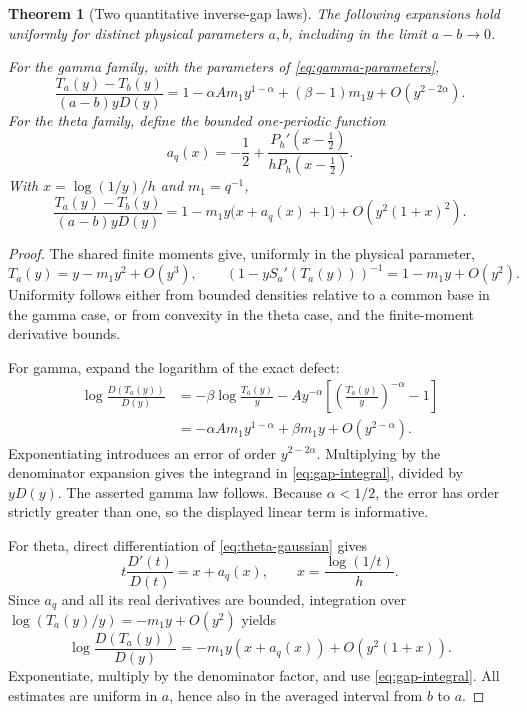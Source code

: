 \documentclass[11pt,a4paper]{article}
\numberwithin{equation}{section}
\newtheorem{theorem}{Theorem}[section]
\theoremstyle{definition}
\theoremstyle{remark}
\begin{document}
\begin{theorem}[Two quantitative inverse-gap laws]
\label{thm:gap-laws}
The following expansions hold uniformly for distinct physical
parameters \(a,b\), including in the limit \(a-b\to0\).

For the gamma family, with the parameters of \eqref{eq:gamma-parameters},
\begin{equation}
 \frac{T_a(y)-T_b(y)}{(a-b)yD(y)}
 =1-\alpha A m_1y^{1-\alpha}
       +(\beta-1)m_1y+O(y^{2-2\alpha}).
 \label{eq:gamma-gap}
\end{equation}
For the theta family, define the bounded one-periodic function
\begin{equation}
 a_q(x)=-\frac12+
 \frac{P_h'(x-\frac12)}{hP_h(x-\frac12)}.
 \label{eq:aq}
\end{equation}
With \(x=\log(1/y)/h\) and \(m_1=q^{-1}\),
\begin{equation}
 \frac{T_a(y)-T_b(y)}{(a-b)yD(y)}
 =1-m_1y\bigl(x+a_q(x)+1\bigr)
       +O\!\left(y^2(1+x)^2\right).
 \label{eq:q-gap}
\end{equation}
\end{theorem}
\begin{proof}
The shared finite moments give, uniformly in the physical parameter,
\[
 T_a(y)=y-m_1y^2+O(y^3),\qquad
 (1-yS_a'(T_a(y)))^{-1}=1-m_1y+O(y^2).
\]
Uniformity follows either from bounded densities relative to a common
base in the gamma case, or from convexity in the theta case, and the
finite-moment derivative bounds.

For gamma, expand the logarithm of the exact defect:
\begin{align*}
 \log\frac{D(T_a(y))}{D(y)}
 &=-\beta\log\frac{T_a(y)}y
   -Ay^{-\alpha}\left[\left(\frac{T_a(y)}y\right)^{-\alpha}-1\right]\\
 &=-\alpha A m_1y^{1-\alpha}+\beta m_1y+O(y^{2-\alpha}).
\end{align*}
Exponentiating introduces an error of order \(y^{2-2\alpha}\).
Multiplying by the denominator expansion gives the integrand in
\eqref{eq:gap-integral}, divided by \(yD(y)\). The asserted gamma law
follows. Because \(\alpha<1/2\), the error has order strictly greater
than one, so the displayed linear term is informative.

For theta, direct differentiation of \eqref{eq:theta-gaussian} gives
\begin{equation}
 t\frac{D'(t)}{D(t)}=x+a_q(x),
 \qquad x=\frac{\log(1/t)}h.
 \label{eq:theta-slope}
\end{equation}
Since \(a_q\) and all its real derivatives are bounded, integration over
\(\log(T_a(y)/y)=-m_1y+O(y^2)\) yields
\[
 \log\frac{D(T_a(y))}{D(y)}
 =-m_1y(x+a_q(x))+O(y^2(1+x)).
\]
Exponentiate, multiply by the denominator factor, and use
\eqref{eq:gap-integral}. All estimates are uniform in \(a\), hence also
in the averaged interval from \(b\) to \(a\).
\end{proof}
\end{document}
